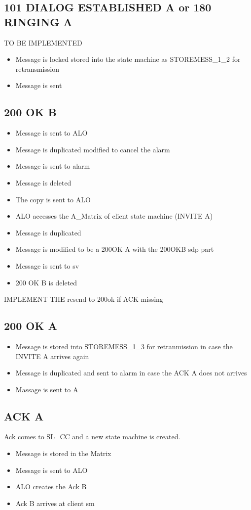 \documentclass[a4paper]{article}
\begin{document}
\subsection{101 DIALOG ESTABLISHED A or 180 RINGING A}
TO BE IMPLEMENTED
\begin {itemize}
\item Message is locked stored into the state machine as STOREMESS\_1\_2 for retransmission 
\item Message is sent
\end{itemize}

\subsection{200 OK B}
\begin {itemize}
\item Message is sent to ALO
\item Message is duplicated modified to cancel the alarm
\item Message is sent to alarm
\item Message is deleted
\item The copy is sent to ALO
\item ALO accesses the A\_Matrix of client state machine (INVITE A)
\item Message is duplicated
\item Message is modified to be a 200OK A with the 200OKB sdp part
\item Message is sent to sv
\item 200 OK B is deleted
\end{itemize}

IMPLEMENT THE resend to 200ok if ACK missing

\subsection{200 OK A}
\begin {itemize}
\item Message is stored into STOREMESS\_1\_3 for retranmission in case the INVITE A arrives again
\item Message is duplicated and sent to alarm in case the ACK A does not arrives
\item Massage is sent to A
\end{itemize}

\subsection{ACK A}
Ack comes to SL\_CC and a new state machine is created.
\begin {itemize}
\item Message is stored in the Matrix 
\item Message is sent to ALO
\item ALO creates the Ack B
\item Ack B arrives at client sm
\end{itemize}
\end{document}
